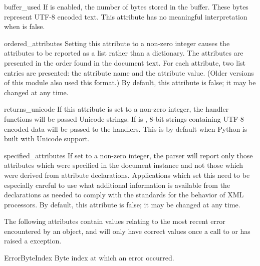 \begin{memberdesc}[xmlparser]{buffer_used}
If  is enabled, the number of bytes stored in the
buffer.  These bytes represent UTF-8 encoded text.  This attribute has
no meaningful interpretation when  is false.
\end{memberdesc}

\begin{memberdesc}[xmlparser]{ordered_attributes}
Setting this attribute to a non-zero integer causes the attributes to
be reported as a list rather than a dictionary.  The attributes are
presented in the order found in the document text.  For each
attribute, two list entries are presented: the attribute name and the
attribute value.  (Older versions of this module also used this
format.)  By default, this attribute is false; it may be changed at
any time.
\end{memberdesc}

\begin{memberdesc}[xmlparser]{returns_unicode} 
If this attribute is set to a non-zero integer, the handler functions
will be passed Unicode strings.  If  is
, 8-bit strings containing UTF-8 encoded data will be
passed to the handlers.  This is  by default when
Python is built with Unicode support.
\end{memberdesc}

\begin{memberdesc}[xmlparser]{specified_attributes}
If set to a non-zero integer, the parser will report only those
attributes which were specified in the document instance and not those
which were derived from attribute declarations.  Applications which
set this need to be especially careful to use what additional
information is available from the declarations as needed to comply
with the standards for the behavior of XML processors.  By default,
this attribute is false; it may be changed at any time.
\end{memberdesc}

The following attributes contain values relating to the most recent
error encountered by an  object, and will only have
correct values once a call to  or 
has raised a  exception.

\begin{memberdesc}[xmlparser]{ErrorByteIndex} 
Byte index at which an error occurred.
\end{memberdesc} 

